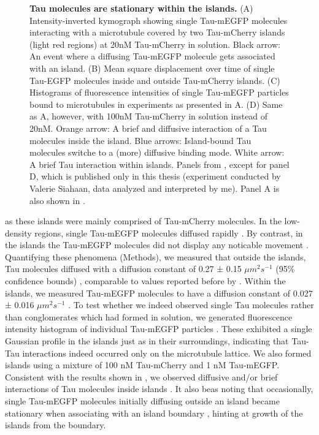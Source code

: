 \begin{figure}
{	\textbf{Tau molecules are stationary within the islands.} (A) Intensity-inverted kymograph showing single Tau-mEGFP molecules interacting with a microtubule covered by two Tau-mCherry islands (light red regions) at 20nM Tau-mCherry in solution. Black arrow: An event where a diffusing Tau-mEGFP molecule gets associated with an island. (B) Mean square displacement over time of single Tau-EGFP molecules inside and outside Tau-mCherry islands. (C) Histograms of fluorescence intensities of single Tau-mEGFP particles bound to microtubules in experiments as presented in A. (D) Same as A, however, with 100nM Tau-mCherry in solution instead of 20nM. Orange arrow: A brief and diffusive interaction of a Tau molecules inside the island. Blue arrows: Island-bound Tau molecules switche to a (more) diffusive binding mode. White arrow: A brief Tau interaction within islands. Panels from \cite{Siahaan2019a}, except for panel D, which is published only in this thesis (experiment conducted by Valerie Siahaan, data analyzed and interpreted by me). Panel A is also shown in \cite{Siahaan}.
		}\label{Tausingle}
\end{figure}
\noindent as these islands were mainly comprised of Tau-mCherry molecules. In the low-density regions, single Tau-mEGFP molecules diffused rapidly . By contrast, in the islands the Tau-mEGFP molecules did not display any noticable movement . Quantifying these phenomena (Methods), we measured that outside the islands, Tau molecules diffused with a diffusion constant of 0.27 ± 0.15 $\mu m^2s^{-1}$ (95\% confidence bounds) , comparable to values reported before by \cite{Hinrichs2012b}. Within the islands, we measured Tau-mEGFP molecules to have a diffusion constant of 0.027 ± 0.016 $\mu m^2s^{-1}$ . To test whether we indeed observed single Tau molecules rather than conglomerates which had formed in solution, we generated fluorescence intensity histogram of individual Tau-mEGFP particles . These exhibited a single Gaussian profile in the islands just as in their surroundings, indicating that Tau-Tau interactions indeed occurred only on the microtubule lattice. We also formed islands using a mixture of 100 nM Tau-mCherry and 1 nM Tau-mEGFP. Consistent with the results shown in , we observed diffusive and/or brief interactions of Tau molecules inside islands . It also beas noting that occasionally, single Tau-mEGFP molecules initially diffusing outside an island became stationary when associating with an island boundary , hinting at growth of the islands from the boundary.\par

